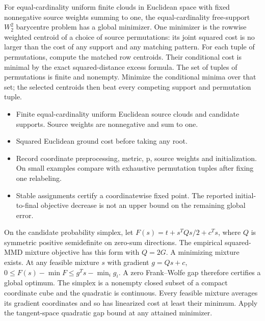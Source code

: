 \expandafter\def\csname statadic@statement@STATADIC-BARYCENTRE-002\endcsname{For equal-cardinality uniform finite clouds in Euclidean space
  with fixed nonnegative source weights summing to one, the equal-cardinality
  free-support $W_2^2$ barycentre problem has a global minimizer. One minimizer
  is the rowwise weighted centroid of a choice of source permutations: its joint
  squared cost is no larger than the cost of any support and any matching pattern.}
\expandafter\def\csname statadic@proof@STATADIC-BARYCENTRE-002\endcsname{For each tuple of permutations, compute the matched row centroids.
  Their conditional cost is minimal by the exact squared-distance excess formula.
  The set of tuples of permutations is finite and nonempty. Minimize the conditional
  minima over that set; the selected centroids then beat every competing support
  and permutation tuple.}
\expandafter\def\csname statadic@assumptions@STATADIC-BARYCENTRE-002\endcsname{\begin{itemize}
\item Finite equal-cardinality uniform Euclidean source clouds and candidate supports. Source weights are nonnegative and sum to one.
\item Squared Euclidean ground cost before taking any root.
\end{itemize}}
\expandafter\def\csname statadic@diagnostics@STATADIC-BARYCENTRE-002\endcsname{\begin{itemize}
\item Record coordinate preprocessing, metric, p, source weights and initialization. On small examples compare with exhaustive permutation tuples after fixing one relabeling.
\item Stable assignments certify a coordinatewise fixed point. The reported initial-to-final objective decrease is not an upper bound on the remaining global error.
\end{itemize}}
\expandafter\def\csname statadic@statement@STATADIC-BARYCENTRE-003\endcsname{On the candidate probability simplex, let
  $F(s)=t+s^TQs/2+c^Ts$, where $Q$ is symmetric positive semidefinite on
  zero-sum directions. The empirical squared-MMD mixture objective has this
  form with $Q=2G$. A minimizing mixture exists. At any feasible mixture $s$
  with gradient $g=Qs+c$, $0\le F(s)-\min F\le g^Ts-\min_i g_i$.
  A zero Frank--Wolfe gap therefore certifies a global optimum.}
\expandafter\def\csname statadic@proof@STATADIC-BARYCENTRE-003\endcsname{The simplex is a nonempty closed subset of a compact coordinate
  cube and the quadratic is continuous. Every feasible mixture averages its
  gradient coordinates and so has linearized cost at least their minimum.
  Apply the tangent-space quadratic gap bound at any attained minimizer.}
